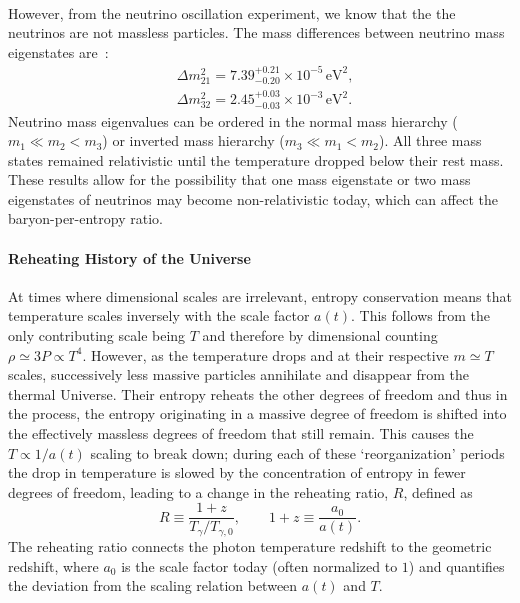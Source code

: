 {\begin{align}
\end{align}
However, from the neutrino oscillation experiment, we know that the the neutrinos are not massless particles. 
The mass differences between neutrino mass eigenstates are~\cite{ParticleDataGroup:2022pth}:
\begin{align}
&\Delta{m}_{21}^2=7.39^{+0.21}_{-0.20}\times10^{-5}\,\mathrm{eV}^2,\\
&\Delta{m}_{32}^2=2.45^{+0.03}_{-0.03}\times10^{-3}\,\mathrm{eV}^2.
\end{align}
Neutrino mass eigenvalues can be ordered in the normal mass hierarchy ($m_1\ll m_2<m_3$) or inverted mass hierarchy ($m_3\ll m_1<m_2$). All three mass states remained relativistic until the temperature dropped below their rest mass. These results allow for the possibility that one mass eigenstate or two mass eigenstates of neutrinos may become non-relativistic today, which can affect the baryon-per-entropy ratio.


\paragraph{Reheating History of the Universe}

At times where dimensional scales are irrelevant, entropy conservation means that temperature scales inversely with the scale factor $a(t)$. This follows from the only contributing scale being $T$ and therefore by dimensional counting $ \rho\simeq 3P \propto T^4$. However, as the temperature drops and at their respective $m\simeq T$ scales, successively less massive particles annihilate and disappear from the thermal Universe. Their entropy reheats the other degrees of freedom and thus in the process, the entropy originating in a massive degree of freedom is shifted into the effectively massless degrees of freedom that still remain. This causes the $T\propto 1/a(t)$ scaling to break down; during each of these `reorganization' periods the drop in temperature is slowed by the concentration of entropy in fewer degrees of freedom, leading to a change in the reheating ratio, $R$, defined as
\begin{equation}\label{redshiftratio}
R\equiv \frac{1+z}{ T_\gamma/T_{\gamma,0}}, \qquad 1+z\equiv \frac{a_{0}}{a(t)}.
\end{equation}
The reheating ratio connects the photon temperature redshift to the geometric redshift, where $a_0$ is the scale factor today (often normalized to $1$) and quantifies the deviation from the scaling relation between $a(t)$ and $T$.

}
